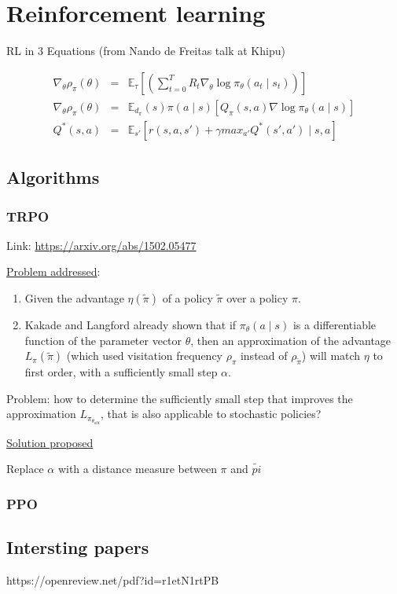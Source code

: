 \documentclass[12pt, english]{article}
\begin{document}
\section{Reinforcement learning}

RL in 3 Equations (from Nando de Freitas talk at Khipu)

\begin{eqnarray}
  \nabla_\theta \rho_\pi (\theta) &=& \mathbb{E}_\tau [(\sum_{t=0}^T R_t \nabla_\theta \log \pi_\theta (a_t \mid s_t))] \\
  \nabla_\theta \rho_\pi (\theta) &=& \mathbb{E}_{d_\pi}(s) \pi(a \mid s) [Q_\pi(s,a) \nabla \log \pi_\theta (a \mid s)] \\
  Q^*(s,a) &=& \mathbb{E}_{s'} [r(s,a,s') + \gamma max_{a'} Q^*(s',a') \mid s,a]
\end{eqnarray}

\subsection{Algorithms}

\subsubsection{TRPO}

Link: \url{https://arxiv.org/abs/1502.05477}

\underline{Problem addressed}:

\begin{enumerate}
  \item Given the advantage $\eta(\tilde{\pi})$ of a policy $\tilde{\pi}$ over a policy $\pi$.
  \item Kakade and Langford already shown that if $\pi_\theta(a \mid s)$ is a differentiable function of the parameter vector $\theta$, then an approximation of the advantage $L_\pi(\tilde{\pi})$ (which used visitation frequency $\rho_\pi$ instead of $\rho_\tilde{\pi}$) will match $\eta$ to first order, with a sufficiently small step $\alpha$.
\end{enumerate}

Problem: how to determine the sufficiently small step that improves the approximation $L_{\pi_{\theta_{old}}}$, that is also applicable to stochastic policies?

\underline{Solution proposed}

Replace $\alpha$ with a distance measure between $\pi$ and $\tilde{pi}$

\subsubsection{PPO}

\subsection{Intersting papers}



https://openreview.net/pdf?id=r1etN1rtPB
\end{document}
